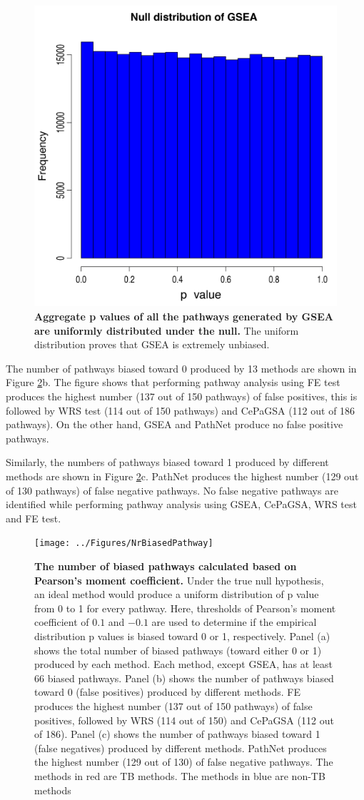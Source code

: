 \begin{figure}
\centering
  \captionsetup{width=.8\linewidth}

	\includegraphics[width=0.5\linewidth]{../Figures/GSEAaggregate}
	\caption{\textbf{Aggregate p values of all the pathways generated by GSEA are uniformly distributed under the null.} The uniform distribution proves that GSEA is extremely unbiased.}\label{fig:GSEAagg}
\end{figure}


The number of pathways biased toward 0 produced by 13 methods are shown in Figure \ref{fig:NumberOfBias}b.
The figure shows that performing pathway analysis using FE test produces the highest number (137 out of 150 pathways) of false positives, this is followed by WRS test (114 out of 150 pathways) and CePaGSA (112 out of 186 pathways). On the other hand, GSEA and PathNet produce no false positive pathways.

Similarly, the numbers of pathways biased toward 1 produced by different methods are shown in Figure \ref{fig:NumberOfBias}c.
PathNet produces the highest number (129 out of 130 pathways) of false negative pathways.
No false negative pathways are identified while performing pathway analysis using GSEA, CePaGSA, WRS test and FE test.

\begin{figure}
\center
	\texttt{[image: ../Figures/NrBiasedPathway]}
        \caption{\textbf{The number of biased pathways calculated based on Pearson's moment coefficient.}  Under the true null hypothesis, an ideal method would produce a uniform distribution of p value from 0 to 1 for every pathway. Here, thresholds of Pearson's moment coefficient of $0.1$ and $-0.1$ are used to determine if the empirical distribution p values is biased toward 0 or 1, respectively.
        Panel (a) shows the total number of biased  pathways (toward either 0 or 1) produced by each method.
Each method, except GSEA, has at least 66 biased pathways.
Panel (b) shows the number of pathways biased toward 0 (false positives) produced by different methods.
FE  produces the highest number (137 out of 150 pathways) of false positives, followed by WRS  (114 out of 150) and CePaGSA (112 out of 186).
Panel (c) shows the number of pathways biased toward 1 (false negatives) produced by different methods.
PathNet produces the highest number (129 out of 130) of false negative pathways. The methods in red are TB methods. The methods in blue are non-TB methods}\label{fig:NumberOfBias}
\end{figure}


